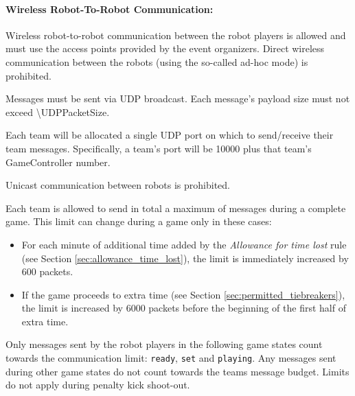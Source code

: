 \paragraph{Wireless Robot-To-Robot Communication:}
\label{sec:robot-to-robot}

Wireless robot-to-robot communication between the robot players is allowed and must use the access points provided by the event organizers. 
Direct wireless communication between the robots (using the so-called ad-hoc mode) is prohibited.

Messages must be sent via UDP broadcast. 
Each message's payload size must not exceed \qty{\UDPPacketSize}{\byte}. 
 
Each team will be allocated a single UDP port on which to send/receive their team messages.
Specifically, a team's port will be 10000 plus that team's GameController number.

Unicast communication between robots is prohibited.


Each team is allowed to send in total a maximum of \UDPPacketLimit{} messages during a complete game. This limit can change during a game only in these cases:

\begin{itemize}
	\item For each minute of additional time added by the \emph{Allowance for time lost} rule (see Section \ref{sec:allowance_time_lost}), the limit is immediately increased by 600 packets.
	\item If the game proceeds to extra time (see Section \ref{sec:permitted_tiebreakers}), the limit is increased by 6000 packets before the beginning of the first half of extra time.
\end{itemize}



Only messages sent by the robot players in the following game states count towards the communication limit: \texttt{ready}, \texttt{set} and \texttt{playing}.
Any messages sent during other game states do not count towards the teams message budget. 
Limits do not apply during penalty kick shoot-out. 

